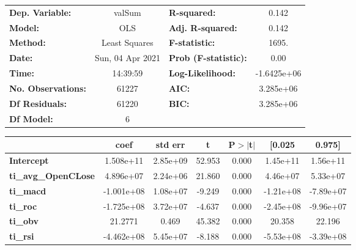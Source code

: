 \begin{center}
\begin{tabular}{lclc}
\toprule
\textbf{Dep. Variable:}     &      valSum      & \textbf{  R-squared:         } &      0.142   \\
\textbf{Model:}             &       OLS        & \textbf{  Adj. R-squared:    } &      0.142   \\
\textbf{Method:}            &  Least Squares   & \textbf{  F-statistic:       } &      1695.   \\
\textbf{Date:}              & Sun, 04 Apr 2021 & \textbf{  Prob (F-statistic):} &      0.00    \\
\textbf{Time:}              &     14:39:59     & \textbf{  Log-Likelihood:    } & -1.6425e+06  \\
\textbf{No. Observations:}  &       61227      & \textbf{  AIC:               } &  3.285e+06   \\
\textbf{Df Residuals:}      &       61220      & \textbf{  BIC:               } &  3.285e+06   \\
\textbf{Df Model:}          &           6      & \textbf{                     } &              \\
\bottomrule
\end{tabular}
\begin{tabular}{lcccccc}
                            & \textbf{coef} & \textbf{std err} & \textbf{t} & \textbf{P$> |$t$|$} & \textbf{[0.025} & \textbf{0.975]}  \\
\midrule
\textbf{Intercept}          &    1.508e+11  &     2.85e+09     &    52.953  &         0.000        &     1.45e+11    &     1.56e+11     \\
\textbf{ti\_avg\_OpenCLose} &    4.896e+07  &     2.24e+06     &    21.860  &         0.000        &     4.46e+07    &     5.33e+07     \\
\textbf{ti\_macd}           &   -1.001e+08  &     1.08e+07     &    -9.249  &         0.000        &    -1.21e+08    &    -7.89e+07     \\
\textbf{ti\_roc}            &   -1.725e+08  &     3.72e+07     &    -4.637  &         0.000        &    -2.45e+08    &    -9.96e+07     \\
\textbf{ti\_obv}            &      21.2771  &        0.469     &    45.382  &         0.000        &       20.358    &       22.196     \\
\textbf{ti\_rsi}            &   -4.462e+08  &     5.45e+07     &    -8.188  &         0.000        &    -5.53e+08    &    -3.39e+08     \\

\end{tabular}
\end{center}

